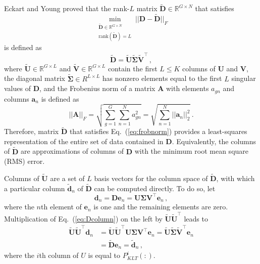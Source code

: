 \documentclass[5p,times,twocolumn,10pt]{elsarticle}
\newcommand{\EQ}[1]{Eq.~(\ref{#1})}               %
\begin{document}
  Eckart and Young\cite{eckart1936approximation} proved that the rank-$L$ 
  matrix $\tilde{\mathbf{D}} \in \mathbb{R}^{G\times N}$
  that satisfies
  \begin{equation}
    \min_{ \substack{\tilde{\mathbf{D}} \in \mathbb{R}^{G\times N} \\ \text{rank}(\tilde{\mathbf{D}})=L }} 
    || \mathbf{D} - \tilde{\mathbf{D}} ||_F 
    \label{eq:frobnorm}
  \end{equation}
  is defined as
  \begin{equation}
    \tilde{\mathbf{D}} = \tilde{\mathbf{U}} \tilde{\bm{\Sigma}} \tilde{\mathbf{V}}^{\intercal} \, ,
    \label{eq:svdL}
  \end{equation}
  where $\tilde{\mathbf{U}} \in \mathbb{R}^{G\times L}$ 
  and   $\tilde{\mathbf{V}} \in \mathbb{R}^{G\times L}$ 
  contain the first $L \leq K$ columns of $\mathbf{U}$ and $\mathbf{V}$,
  the diagonal matrix $\tilde{\bm{\Sigma}} \in R^{L\times L}$ 
  has nonzero elements equal to 
  the first $L$ singular values of $\mathbf{D}$, and the
  Frobenius norm of a matrix $\mathbf{A}$ with 
  elements $a_{gn}$ and columns $\mathbf{a}_n$ is defined as
  \begin{equation}
    ||\mathbf{A}||_F = \sqrt{\sum^G_{g=1} \sum^N_{n=1} a_{gn}^2} = \sqrt{\sum_{n=1}^N ||\mathbf{a}_n||^2_2 }\, .
  \end{equation}
  Therefore, matrix $\tilde{\mathbf{D}}$ that satisfies \EQ{eq:frobnorm} 
  provides a least-squares representation of the entire set of data
  contained in $\mathbf{D}$.  Equivalently, 
  the columns of $\tilde{\mathbf{D}}$ are approximations
  of columns of $\mathbf{D}$ with the  
  minimum root mean square (RMS) error.  
  
  Columns of $\tilde{\mathbf{U}}$ are a set of $L$ basis 
  vectors for the column space of $\tilde{\mathbf{D}}$, with which
  a particular 
  column $\tilde{\mathbf{d}}_n$ of $\tilde{\mathbf{D}}$ can be computed 
  directly.  To do so, let
  \begin{equation}
    \mathbf{d}_n = \mathbf{D} \mathbf{e}_n = \mathbf{U}\bm{\Sigma} \mathbf{V}^{\intercal} \mathbf{e}_n  \, ,
    \label{eq:Dcolumn}
  \end{equation}
  where the $n$th element of $\mathbf{e}_n$ is one and the remaining elements are zero.
  Multiplication of \EQ{eq:Dcolumn} on the left 
  by $\tilde{\mathbf{U}} \tilde{\mathbf{U}}^{\intercal}$ leads to
  \begin{equation}
    \begin{split}
      \tilde{\mathbf{U}} \tilde{\mathbf{U}}^{\intercal} \mathbf{d}_n 
      &= \tilde{\mathbf{U}}\tilde{\mathbf{U}}^{\intercal} \mathbf{U}\bm{\Sigma} \mathbf{V}^{\intercal} \mathbf{e}_n  
      = \tilde{\mathbf{U}} \tilde{\bm{\Sigma}} \tilde{\mathbf{V}}^{\intercal} \mathbf{e}_n \\
      &= \tilde{\mathbf{D}} \mathbf{e}_n
      = \tilde{\mathbf{d}}_n \, ,
    \end{split}
  \end{equation}
  where the $i$th column of $U$ is equal to $P^i_{KLT}(:)$.
  
\end{document}
